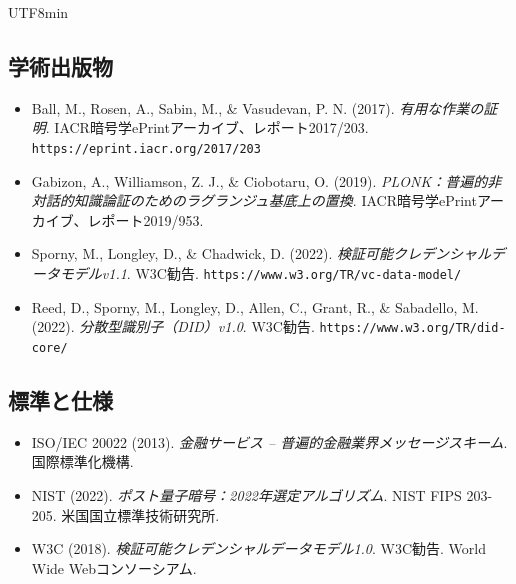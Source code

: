 \documentclass[11pt]{article}
\begin{document}
\begin{CJK}{UTF8}{min}

\subsection*{学術出版物}

\begin{itemize}[leftmargin=*, label={}]
  \item Ball, M., Rosen, A., Sabin, M., \& Vasudevan, P. N. (2017). \textit{有用な作業の証明}. IACR暗号学ePrintアーカイブ、レポート2017/203. \texttt{https://eprint.iacr.org/2017/203}

  \item Gabizon, A., Williamson, Z. J., \& Ciobotaru, O. (2019). \textit{PLONK：普遍的非対話的知識論証のためのラグランジュ基底上の置換}. IACR暗号学ePrintアーカイブ、レポート2019/953.

  \item Sporny, M., Longley, D., \& Chadwick, D. (2022). \textit{検証可能クレデンシャルデータモデルv1.1}. W3C勧告. \texttt{https://www.w3.org/TR/vc-data-model/}

  \item Reed, D., Sporny, M., Longley, D., Allen, C., Grant, R., \& Sabadello, M. (2022). \textit{分散型識別子（DID）v1.0}. W3C勧告. \texttt{https://www.w3.org/TR/did-core/}
\end{itemize}

\subsection*{標準と仕様}

\begin{itemize}[leftmargin=*, label={}]
  \item ISO/IEC 20022 (2013). \textit{金融サービス -- 普遍的金融業界メッセージスキーム}. 国際標準化機構.

  \item NIST (2022). \textit{ポスト量子暗号：2022年選定アルゴリズム}. NIST FIPS 203-205. 米国国立標準技術研究所.

  \item W3C (2018). \textit{検証可能クレデンシャルデータモデル1.0}. W3C勧告. World Wide Webコンソーシアム.
\end{itemize}

\end{CJK}
\end{document}
